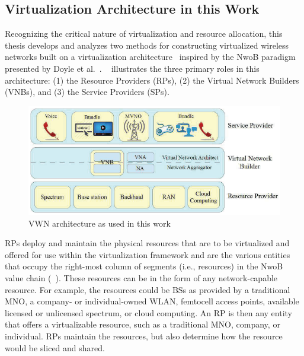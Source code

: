 \documentclass[12pt,dvipsnames]{report}
\begin{document}
\subsection{Virtualization Architecture in this Work} \label{subsec:virtualization_architecture}

Recognizing the critical nature of virtualization and resource allocation, this thesis develops and analyzes two methods for constructing virtualized wireless networks built on a virtualization architecture~\cite{MJ_CCNC_16, MJ_MECOMM_17} inspired by the NwoB paradigm presented by Doyle et al.~\cite{6737248}.  ~\cite{MJ_CCNC_16, MJ_MECOMM_17} illustrates the three primary roles in this architecture: (1) the Resource Providers (RPs), (2) the Virtual Network Builders (VNBs), and (3) the Service Providers (SPs).

\begin{figure}[ht]
	\centering
	\includegraphics[width=1\linewidth]{VWNArchitecture}
	\caption[VWN architecture as used in this work]{VWN architecture as used in this work~\cite{MJ_CCNC_16, MJ_MECOMM_17}}
	\label{fig:VWNArchitecture}
\end{figure}

RPs deploy and maintain the physical resources that are to be virtualized and offered for use within the virtualization framework and are the various entities that occupy the right-most column of segments (i.e., resources) in the NwoB value chain (~\cite{6737248}).  These resources can be in the form of any network-capable resource.  For example, the resources could be BSs as provided by a traditional MNO, a company- or individual-owned WLAN, femtocell access points, available licensed or unlicensed spectrum, or cloud computing.  An RP is then any entity that offers a virtualizable resource, such as a traditional MNO, company, or individual.  RPs maintain the resources, but also determine how the resource would be sliced and shared.
\end{document}
